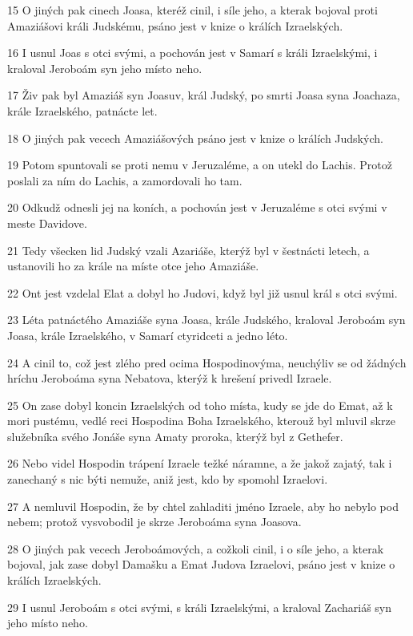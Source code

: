 \par 15 O jiných pak cinech Joasa, kteréž cinil, i síle jeho, a kterak bojoval proti Amaziášovi králi Judskému, psáno jest v knize o králích Izraelských.
\par 16 I usnul Joas s otci svými, a pochován jest v Samarí s králi Izraelskými, i kraloval Jeroboám syn jeho místo neho.
\par 17 Živ pak byl Amaziáš syn Joasuv, král Judský, po smrti Joasa syna Joachaza, krále Izraelského, patnácte let.
\par 18 O jiných pak vecech Amaziášových psáno jest v knize o králích Judských.
\par 19 Potom spuntovali se proti nemu v Jeruzaléme, a on utekl do Lachis. Protož poslali za ním do Lachis, a zamordovali ho tam.
\par 20 Odkudž odnesli jej na koních, a pochován jest v Jeruzaléme s otci svými v meste Davidove.
\par 21 Tedy všecken lid Judský vzali Azariáše, kterýž byl v šestnácti letech, a ustanovili ho za krále na míste otce jeho Amaziáše.
\par 22 Ont jest vzdelal Elat a dobyl ho Judovi, když byl již usnul král s otci svými.
\par 23 Léta patnáctého Amaziáše syna Joasa, krále Judského, kraloval Jeroboám syn Joasa, krále Izraelského, v Samarí ctyridceti a jedno léto.
\par 24 A cinil to, což jest zlého pred ocima Hospodinovýma, neuchýliv se od žádných hríchu Jeroboáma syna Nebatova, kterýž k hrešení privedl Izraele.
\par 25 On zase dobyl koncin Izraelských od toho místa, kudy se jde do Emat, až k mori pustému, vedlé reci Hospodina Boha Izraelského, kterouž byl mluvil skrze služebníka svého Jonáše syna Amaty proroka, kterýž byl z Gethefer.
\par 26 Nebo videl Hospodin trápení Izraele težké náramne, a že jakož zajatý, tak i zanechaný s nic býti nemuže, aniž jest, kdo by spomohl Izraelovi.
\par 27 A nemluvil Hospodin, že by chtel zahladiti jméno Izraele, aby ho nebylo pod nebem; protož vysvobodil je skrze Jeroboáma syna Joasova.
\par 28 O jiných pak vecech Jeroboámových, a cožkoli cinil, i o síle jeho, a kterak bojoval, jak zase dobyl Damašku a Emat Judova Izraelovi, psáno jest v knize o králích Izraelských.
\par 29 I usnul Jeroboám s otci svými, s králi Izraelskými, a kraloval Zachariáš syn jeho místo neho.

